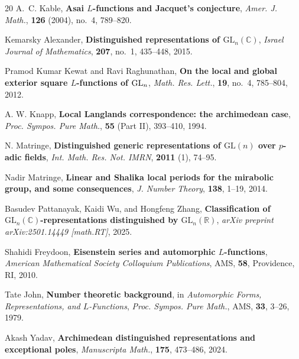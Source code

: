 \documentclass[12pt,reqno]{amsart}
\numberwithin{equation}{section}%
\numberwithin{equation}{subsection}
\theoremstyle{definition}
\theoremstyle{remark}
\begin{document}
{\begin{thebibliography}{20}
A.~C. Kable, \textbf{Asai $L$-functions and Jacquet's conjecture},
\textit{Amer. J. Math.}, \textbf{126} (2004), no.~4, 789--820.

Kemarsky Alexander, \textbf{Distinguished representations of
$\mathrm{GL}_n(\mathbb{C})$},
\textit{Israel Journal of Mathematics}, \textbf{207}, no.~1,
435--448, 2015.

Pramod Kumar Kewat and Ravi Raghunathan,
\textbf{On the local and global exterior square \(L\)-functions of \({\rm GL}_n\)},
\textit{Math. Res. Lett.}, \textbf{19}, no.~4, 785--804, 2012.

A. W. Knapp,
\textbf{Local Langlands correspondence: the archimedean case},
\textit{Proc. Sympos. Pure Math.}, \textbf{55} (Part II),
393--410, 1994.

N. Matringe,
\textbf{Distinguished generic representations of
\(\mathrm{GL}(n)\) over \(p\)-adic fields},
\textit{Int. Math. Res. Not. IMRN}, \textbf{2011} (1),
74--95.

Nadir Matringe,
\textbf{Linear and Shalika local periods for the mirabolic group, and some consequences},
\textit{J. Number Theory}, \textbf{138}, 1--19, 2014.

Basudev Pattanayak, Kaidi Wu, and Hongfeng Zhang,
\textbf{Classification of \(\mathrm{GL}_{n}(\mathbb{C})\)-representations
distinguished by \(\mathrm{GL}_{n}(\mathbb{R})\)},
\textit{arXiv preprint arXiv:2501.14449 [math.RT]}, 2025.

Shahidi Freydoon, \textbf{Eisenstein series and automorphic $L$-functions},
\textit{American Mathematical Society Colloquium Publications},
AMS, \textbf{58}, Providence, RI, 2010.

Tate John, \textbf{Number theoretic background}, in
\textit{Automorphic Forms, Representations, and $L$-Functions},
\textit{Proc. Sympos. Pure Math.}, AMS, \textbf{33}, 3--26, 1979.


Akash Yadav,
\textbf{Archimedean distinguished representations and exceptional poles},
\textit{Manuscripta Math.}, \textbf{175}, 473--486, 2024.

\end{thebibliography}
}
\end{document}
